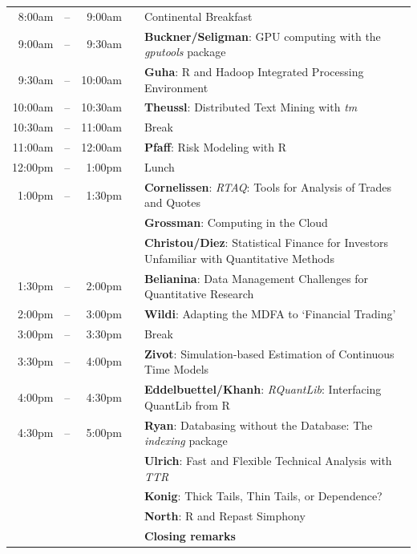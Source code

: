 \documentclass[11pt]{article}
\newcommand{\mylinecolor}[1]{\color{#1}\vspace{-8pt}}  %
\begin{document}
\begin{tabular}{rlrlp{5in}}
  8:00am  & -- &  9:00am &   & \small{\mylinecolor{Breaks} Continental Breakfast}  \\
  9:00am  & -- &  9:30am &   & \textbf{\color{Talk} Buckner/Seligman}: \small{GPU computing with the \emph{gputools} package} \\
  9:30am  & -- & 10:00am &   & \textbf{\color{Talk} Guha}: \small{R and Hadoop Integrated Processing Environment} \\
  10:00am & -- & 10:30am &   & \textbf{\color{Talk} Theussl}: \small{Distributed Text Mining with \emph{tm}} \\
  10:30am & -- & 11:00am &   & \small{\mylinecolor{Breaks}  Break}  \\
  11:00am & -- & 12:00am &   & \textbf{\color{KeynoteTalk} Pfaff}: \small{Risk Modeling with R} \\
  12:00pm & -- &  1:00pm &   & \small{\mylinecolor{Breaks}  Lunch}  \\
   1:00pm & -- &  1:30pm &   & \textbf{\color{LightningTalk} Cornelissen}: \small{\emph{RTAQ}: Tools for Analysis of Trades and Quotes} \\
          &    &         &   & \textbf{\color{LightningTalk} Grossman}: \small{Computing in the Cloud} \\
          &    &         &   & \textbf{\color{LightningTalk} Christou/Diez}: \small{Statistical Finance for Investors Unfamiliar with Quantitative Methods} \\
   1:30pm & -- & 2:00pm  &   & \textbf{\color{Talk} Belianina}: \small{Data Management Challenges for Quantitative Research} \\
   2:00pm & -- & 3:00pm  &   & \textbf{\color{KeynoteTalk} Wildi}: \small{Adapting the MDFA to `Financial Trading'} \\
   3:00pm & -- & 3:30pm  &   & \small{\mylinecolor{Breaks} Break} \\
   3:30pm & -- & 4:00pm  &   & \textbf{\color{Talk} Zivot}: \small{Simulation-based Estimation of Continuous Time Models} \\
   4:00pm & -- & 4:30pm  &   & \textbf{\color{Talk} Eddelbuettel/Khanh}: \small{\emph{RQuantLib}: Interfacing QuantLib from R} \\
   4:30pm & -- & 5:00pm  &   & \textbf{\color{LightningTalk} Ryan}: \small{Databasing without the Database: The \emph{indexing} package} \\
          &    &         &   & \textbf{\color{LightningTalk} Ulrich}: \small{Fast and Flexible Technical Analysis with \emph{TTR}} \\
          &    &         &   & \textbf{\color{LightningTalk} Konig}: \small{Thick Tails, Thin Tails, or Dependence?} \\
          &    &         &   & \textbf{\color{LightningTalk} North}: \small{R and Repast Simphony} \\
          &    &         &   & \textbf{\color{Breaks} Closing remarks} \\
\end{tabular}
\end{document}
